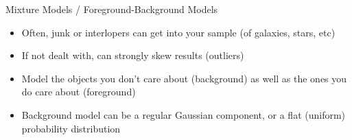 \documentclass[compress,t]{beamer}
\begin{document}
\begin{frame}{Mixture Models / Foreground-Background Models}
  \begin{itemize}
    \item Often, \alert{junk} or \alert{interlopers} can get into your
      sample (of galaxies, stars, etc)
    \item If not dealt with, can strongly skew results (outliers)
    \item \alert{Model} the objects you don't care about (background)
      \alert{as well as} the ones you do care about (foreground)
    \item Background model can be a regular Gaussian component, or a
      flat (uniform) probability distribution
  \end{itemize}
\end{frame}
\end{document}
